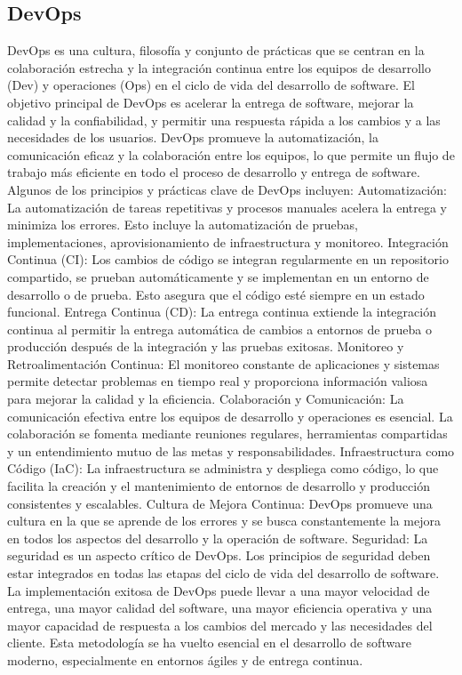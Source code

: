 \subsection{DevOps}
DevOps es una cultura, filosofía y conjunto de prácticas que se centran en la colaboración estrecha y la integración continua entre los equipos de desarrollo (Dev) y operaciones (Ops) en el ciclo de vida del desarrollo de software. El objetivo principal de DevOps es acelerar la entrega de software, mejorar la calidad y la confiabilidad, y permitir una respuesta rápida a los cambios y a las necesidades de los usuarios. DevOps promueve la automatización, la comunicación eficaz y la colaboración entre los equipos, lo que permite un flujo de trabajo más eficiente en todo el proceso de desarrollo y entrega de software.
Algunos de los principios y prácticas clave de DevOps incluyen:
Automatización: La automatización de tareas repetitivas y procesos manuales acelera la entrega y minimiza los errores. Esto incluye la automatización de pruebas, implementaciones, aprovisionamiento de infraestructura y monitoreo.
Integración Continua (CI): Los cambios de código se integran regularmente en un repositorio compartido, se prueban automáticamente y se implementan en un entorno de desarrollo o de prueba. Esto asegura que el código esté siempre en un estado funcional.
Entrega Continua (CD): La entrega continua extiende la integración continua al permitir la entrega automática de cambios a entornos de prueba o producción después de la integración y las pruebas exitosas.
Monitoreo y Retroalimentación Continua: El monitoreo constante de aplicaciones y sistemas permite detectar problemas en tiempo real y proporciona información valiosa para mejorar la calidad y la eficiencia.
Colaboración y Comunicación: La comunicación efectiva entre los equipos de desarrollo y operaciones es esencial. La colaboración se fomenta mediante reuniones regulares, herramientas compartidas y un entendimiento mutuo de las metas y responsabilidades.
Infraestructura como Código (IaC): La infraestructura se administra y despliega como código, lo que facilita la creación y el mantenimiento de entornos de desarrollo y producción consistentes y escalables.
Cultura de Mejora Continua: DevOps promueve una cultura en la que se aprende de los errores y se busca constantemente la mejora en todos los aspectos del desarrollo y la operación de software.
Seguridad: La seguridad es un aspecto crítico de DevOps. Los principios de seguridad deben estar integrados en todas las etapas del ciclo de vida del desarrollo de software.
La implementación exitosa de DevOps puede llevar a una mayor velocidad de entrega, una mayor calidad del software, una mayor eficiencia operativa y una mayor capacidad de respuesta a los cambios del mercado y las necesidades del cliente. Esta metodología se ha vuelto esencial en el desarrollo de software moderno, especialmente en entornos ágiles y de entrega continua.


